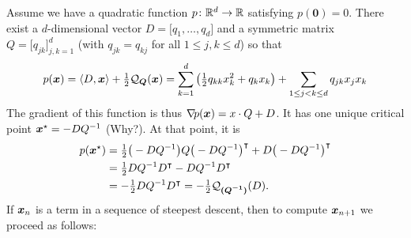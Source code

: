 Assume we have a quadratic function $p\colon \mathbb{R}^d \to \mathbb{R}$ satisfying $p(\boldsymbol{0}) = 0$.  There exist a $d$-dimensional vector $D = \big[q_1, \dotsc, q_d\big]$ and a symmetric matrix $Q = \big[ q_{jk} \big]_{j,k=1}^d$ (with $q_{jk}=q_{kj}$ for all $1\leq j,k \leq d$) so that
\begin{equation*}
p(\boldsymbol{x}) = \langle D, \boldsymbol{x} \rangle + \tfrac{1}{2}\mathcal{Q}_{\boldsymbol{Q}}(\boldsymbol{x}) = \sum_{k=1}^d \big( \tfrac{1}{2}q_{kk}x_k^2 + q_k x_k\big) + \sum_{1\leq j<k \leq d} q_{jk} x_j x_k
\end{equation*}
The gradient of this function is thus $\mathop{\nabla\! {p}}(\boldsymbol{x}) = x \cdot Q + D$.  It has one unique critical point $\boldsymbol{x}^{\star} = -D Q^{-1}$ (Why?).  At that point, it is 
\begin{align}
p(\boldsymbol{x}^{\star}) &= \tfrac{1}{2} \big( -D Q^{-1} \big)  Q {\big( -D Q^{-1} \big)}^\intercal + D {\big( -D Q^{-1} \big)}^\intercal \nonumber \\ 
&= \tfrac{1}{2} D Q^{-1} {D}^\intercal - D Q^{-1} {D}^\intercal \nonumber \\
&= -\tfrac{1}{2} D Q^{-1} {D}^\intercal = -\tfrac{1}{2}\mathcal{Q}_{\boldsymbol{(Q^{-1})}}(D). \label{equation:pstarSD}
\end{align}
If $\boldsymbol{x}_n$ is a term in a sequence of steepest descent, then to compute $\boldsymbol{x}_{n+1}$ we proceed as follows:
